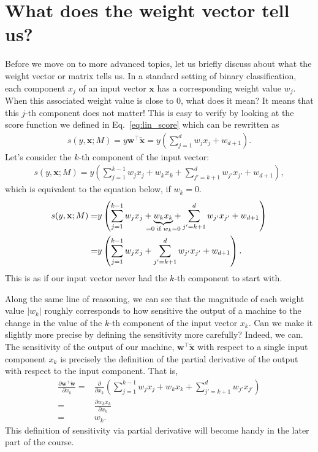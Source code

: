 \documentclass{report}
\newcommand{\vect}[1]{\mathbf{#1}}
\newcommand{\vx}[0]{\vect{x}}
\newcommand{\vw}[0]{\vect{w}}
\begin{document}
\section{What does the weight vector tell us?}
\label{sec:weight}

Before we move on to more advanced topics, let us briefly discuss about what the
weight vector or matrix tells us. In a standard setting of binary
classification, each component $x_j$ of an input vector $\vx$ has a
corresponding weight value $w_j$. When this associated weight value is close to
$0$, what does it mean? It means that this $j$-th component does not matter!
This is easy to verify by looking at the score function we defined in
Eq.~\eqref{eq:lin_score} which can be rewritten as
\begin{align*}
    s(y, \vx; M) = y \vw^\top \tilde{\vx} = 
    y \left( \sum_{j=1}^{d} w_j x_j + w_{d+1} \right).
\end{align*}
Let's consider the $k$-th component of the input vector:
\begin{align*}
    s(y, \vx; M) = 
    y \left( 
        \sum_{j=1}^{k-1} w_j x_j + 
        w_k x_k +
        \sum_{j'=k+1}^{d} w_{j'} x_{j'} + 
    w_{d+1} \right),
\end{align*}
which is equivalent to the equation below, if $w_k=0$.
\begin{align*}
    s(y, \vx; M) =&
    y \left( 
        \sum_{j=1}^{k-1} w_j x_j + 
        \underbrace{w_k x_k}_{\mathclap{=0\text{ if }w_k=0}} +
        \sum_{j'=k+1}^{d} w_{j'} x_{j'} + 
    w_{d+1} \right)
    \\
    =& 
    y \left( 
        \sum_{j=1}^{k-1} w_j x_j + 
        \sum_{j'=k+1}^{d} w_{j'} x_{j'} + 
    w_{d+1} \right).
\end{align*}
This is as if our input vector never had the $k$-th component to start with. 

Along the same line of reasoning, we can see that the magnitude of each weight
value $\left| w_k \right|$ roughly corresponds to how sensitive the output of a
machine to the change in the value of the $k$-th component of the input vector
$x_k$. Can we make it slightly more precise by defining the sensitivity more
carefully? Indeed, we can. The sensitivity of the output of our machine,
$\vw^\top \tilde{\vx}$ with respect to a single input component $x_k$ is
precisely the definition of the partial derivative of the output with respect to
the input component. That is,
\begin{align*}
    \frac{\partial \vw^\top \tilde{\vw}}{\partial x_k}
    =& \frac{\partial}{\partial x_k} \left(
    \sum_{j=1}^{k-1} w_j x_j + 
    w_k x_k +
    \sum_{j'=k+1}^{d} w_{j'} x_{j'} \right) \\
    =& \frac{\partial w_k x_k} {\partial x_k} \\
    =& w_k.
\end{align*}
This definition of sensitivity via partial derivative will become handy in the
later part of the course.
\end{document}
